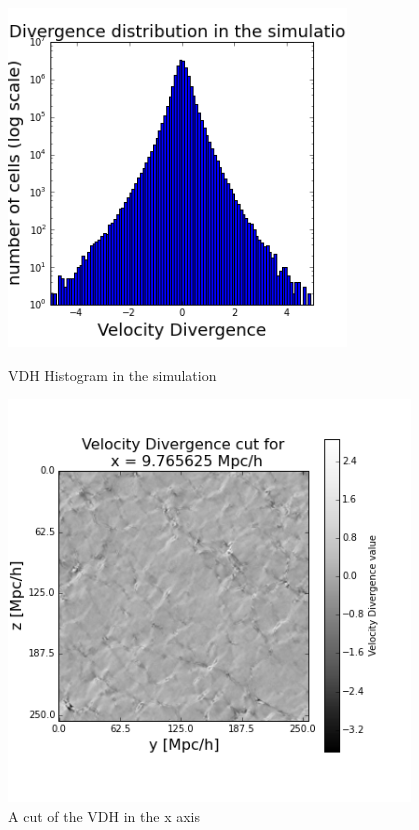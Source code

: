 \documentclass[12pt]{article}
\begin{document}
\begin{figure}[ht]
\centering
\begin{minipage}{.5\textwidth}
  \centering
  \includegraphics[width=0.8\textwidth]{simulation/Trace_hist_sim.png} %
\caption{VDH Histogram in the simulation}
\label{fg:hist_Trace}
\end{minipage}%
\begin{minipage}{.5\textwidth}
  \centering
  \includegraphics[width=0.95\textwidth]{simulation/Trace_cut_i_10.png}
  \caption{A cut of the VDH in the x axis}
\label{fg:cut_Trace}
\end{minipage}
\end{figure}
\FloatBarrier
\end{document}
